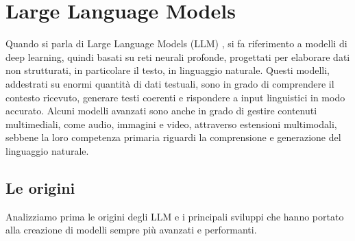 \chapter{Large Language Models}
Quando si parla di Large Language Models (LLM) \cite{minaee2024largelanguagemodelssurvey}, si fa riferimento a modelli di deep learning, quindi basati su reti neurali profonde, progettati per elaborare dati non strutturati, in particolare il testo, in linguaggio naturale. Questi modelli, addestrati su enormi quantità di dati testuali, sono in grado di comprendere il contesto ricevuto, generare testi coerenti e rispondere a input linguistici in modo accurato. Alcuni modelli avanzati sono anche in grado di gestire contenuti multimediali, come audio, immagini e video, attraverso estensioni multimodali, sebbene la loro competenza primaria riguardi la comprensione e generazione del linguaggio naturale.

\section{Le origini}
Analizziamo prima le origini degli LLM e i principali sviluppi che hanno portato alla creazione di modelli sempre più avanzati e performanti.

